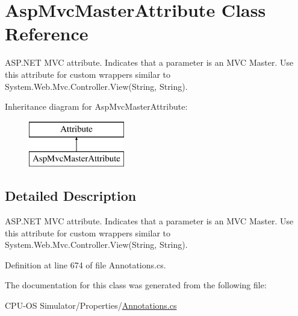 \hypertarget{class_asp_mvc_master_attribute}{}\section{Asp\+Mvc\+Master\+Attribute Class Reference}
\label{class_asp_mvc_master_attribute}


A\+S\+P.\+N\+E\+T M\+V\+C attribute. Indicates that a parameter is an M\+V\+C Master. Use this attribute for custom wrappers similar to {\ttfamily System.\+Web.\+Mvc.\+Controller.\+View(\+String, String)}.  


Inheritance diagram for Asp\+Mvc\+Master\+Attribute\+:\begin{figure}[H]
\begin{center}
\leavevmode
\includegraphics[height=2.000000cm]{class_asp_mvc_master_attribute}
\end{center}
\end{figure}


\subsection{Detailed Description}
A\+S\+P.\+N\+E\+T M\+V\+C attribute. Indicates that a parameter is an M\+V\+C Master. Use this attribute for custom wrappers similar to {\ttfamily System.\+Web.\+Mvc.\+Controller.\+View(\+String, String)}. 



Definition at line 674 of file Annotations.\+cs.



The documentation for this class was generated from the following file\+:\begin{DoxyCompactItemize}
\item 
C\+P\+U-\/\+O\+S Simulator/\+Properties/\hyperlink{_annotations_8cs}{Annotations.\+cs}\end{DoxyCompactItemize}
